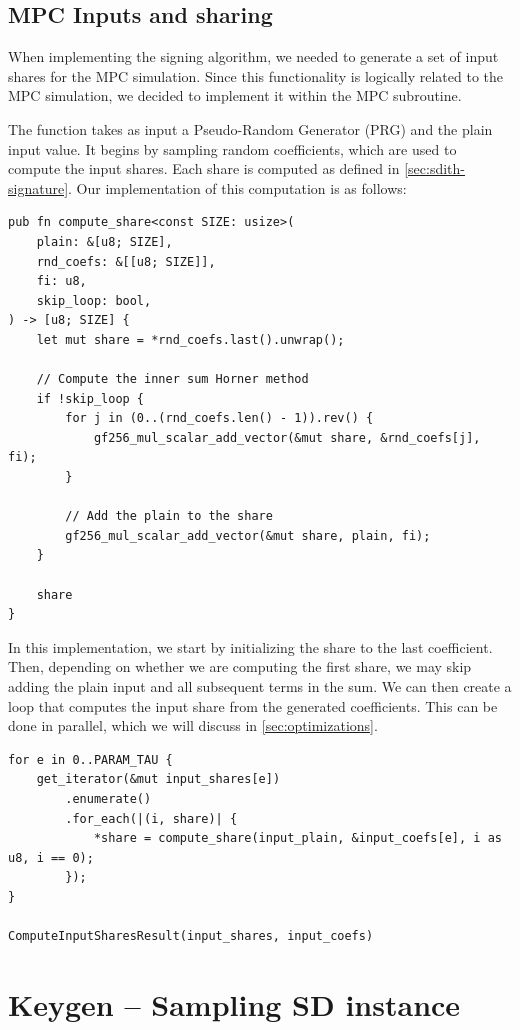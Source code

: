\documentclass[11pt]{report}
\theoremstyle{definition}
\theoremstyle{plain}
\begin{document}
\subsection{MPC Inputs and sharing}
When implementing the signing algorithm, we needed to generate a set of input shares for the MPC simulation. Since this functionality is logically related to the MPC simulation, we decided to implement it within the MPC subroutine.

The function takes as input a Pseudo-Random Generator (PRG) and the plain input value. It begins by sampling random coefficients, which are used to compute the input shares. Each share is computed as defined in \autoref{sec:sdith-signature}. Our implementation of this computation is as follows:

\begin{verbatim}
pub fn compute_share<const SIZE: usize>(
    plain: &[u8; SIZE],
    rnd_coefs: &[[u8; SIZE]],
    fi: u8,
    skip_loop: bool,
) -> [u8; SIZE] {
    let mut share = *rnd_coefs.last().unwrap();

    // Compute the inner sum Horner method
    if !skip_loop {
        for j in (0..(rnd_coefs.len() - 1)).rev() {
            gf256_mul_scalar_add_vector(&mut share, &rnd_coefs[j], fi);
        }

        // Add the plain to the share
        gf256_mul_scalar_add_vector(&mut share, plain, fi);
    }

    share
}
\end{verbatim}

In this implementation, we start by initializing the share to the last coefficient. Then, depending on whether we are computing the first share, we may skip adding the plain input and all subsequent terms in the sum.
We can then create a loop that computes the input share from the generated coefficients. This can be done in parallel, which we will discuss in \autoref{sec:optimizations}.

\begin{verbatim}
for e in 0..PARAM_TAU {
    get_iterator(&mut input_shares[e])
        .enumerate()
        .for_each(|(i, share)| {
            *share = compute_share(input_plain, &input_coefs[e], i as u8, i == 0);
        });
}

ComputeInputSharesResult(input_shares, input_coefs)
\end{verbatim}

\section{Keygen -- Sampling SD instance}\label{sub:witness_generation}
\end{document}
